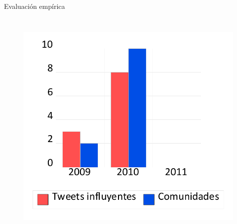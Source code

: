 \begin{frame}[t]
\begin{block}{Evaluación empírica}
\begin{minipage}[t][.40\textheight][t]{\textwidth}
\begin{column}{0.3\textwidth}
\begin{figure}[H]
\begin{center}
         \end{center}
    \end{figure}
\end{column}
\begin{column}{0.3\textwidth}  
    \tiny
    \begin{figure}[H]
        \begin{center}
         \includegraphics[width=1\textwidth]{images/C3/c3_times_series_2010.pdf}
         \end{center}
    \end{figure}
\end{column}

\end{minipage}
\end{block}


\end{frame}
